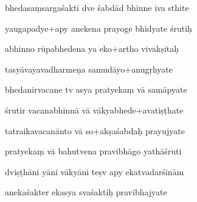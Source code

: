 \documentclass[article,12pt,a4paper]{memoir}%
\newcounter{parCount}
\begin{document}
	  
	  \pstart {} bhedasaṃsargaśaktī dve śabdād bhinne iva sthite 
	{}
	\pend%
      

	  
	  \pstart \leavevmode%
	yaugapadye+apy anekena prayoge bhidyate śrutiḥ 
	{}
	\pend%
      

	  
	  \pstart {} abhinno rūpabhedena ya eko+artho vivakṣitaḥ 
	{}
	\pend%
      

	  
	  \pstart \leavevmode%
	tasyāvayavadharmeṇa samudāyo+anugṛhyate 
	{}
	\pend%
      

	  
	  \pstart {} bhedanirvacane tv asya pratyekaṃ vā samāpyate 
	{}
	\pend%
      

	  
	  \pstart \leavevmode%
	śrutir vacanabhinnā vā vākyabhede+avatiṣṭhate 
	{}
	\pend%
      

	  
	  \pstart {} tatraikavacanānto vā so+akṣaśabdaḥ prayujyate 
	{}
	\pend%
      

	  
	  \pstart \leavevmode%
	pratyekaṃ vā bahutvena pravibhāgo yathāśruti 
	{}
	\pend%
      

	  
	  \pstart {} dviṣṭhāni yāni vākyāni teṣv apy ekatvadarśinām 
	{}
	\pend%
      

	  
	  \pstart \leavevmode%
	anekaśakter ekasya svaśaktiḥ pravibhajyate 
	{}
	\pend%
      
\end{document}
